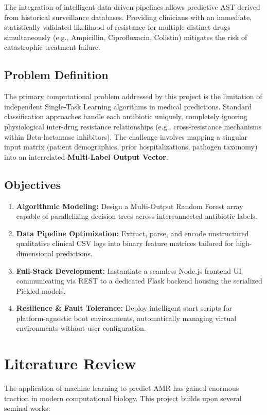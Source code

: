 \documentclass[conference]{IEEEtran}
\begin{document}
The integration of intelligent data-driven pipelines allows predictive AST derived from historical surveillance databases. Providing clinicians with an immediate, statistically validated likelihood of resistance for multiple distinct drugs simultaneously (e.g., Ampicillin, Ciprofloxacin, Colistin) mitigates the risk of catastrophic treatment failure.

\subsection{Problem Definition}
The primary computational problem addressed by this project is the limitation of independent Single-Task Learning algorithms in medical predictions. Standard classification approaches handle each antibiotic uniquely, completely ignoring physiological inter-drug resistance relationships (e.g., cross-resistance mechanisms within Beta-lactamase inhibitors). The challenge involves mapping a singular input matrix (patient demographics, prior hospitalizations, pathogen taxonomy) into an interrelated \textbf{Multi-Label Output Vector}.

\subsection{Objectives}
\begin{enumerate}
    \item \textbf{Algorithmic Modeling:} Design a Multi-Output Random Forest array capable of parallelizing decision trees across interconnected antibiotic labels.
    \item \textbf{Data Pipeline Optimization:} Extract, parse, and encode unstructured qualitative clinical CSV logs into binary feature matrices tailored for high-dimensional predictions.
    \item \textbf{Full-Stack Development:} Instantiate a seamless Node.js frontend UI communicating via REST to a dedicated Flask backend housing the serialized Pickled models.
    \item \textbf{Resilience \& Fault Tolerance:} Deploy intelligent start scripts for platform-agnostic boot environments, automatically managing virtual environments without user configuration.
\end{enumerate}

\section{Literature Review}
The application of machine learning to predict AMR has gained enormous traction in modern computational biology. This project builds upon several seminal works:
\end{document}
